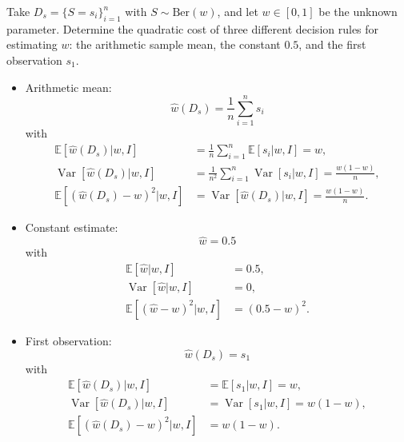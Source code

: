 \begin{example}
	Take $D_s= \{S = s_i\}_{i=1}^n$ with $S \sim \mathrm{Ber}(w)$, and let $w\in [0,1]$ be the unknown parameter. Determine the quadratic cost of three different decision rules for estimating $w$: the arithmetic sample mean, the constant $0.5$, and the first observation $s_1$.
	
	\begin{itemize}
		\item Arithmetic mean:
		\begin{equation}
			\hat{w}(D_s) = \frac{1}{n} \sum_{i=1}^n s_i
		\end{equation}
		with
		\begin{equation}
			\begin{split}
				\mathbb{E}[\hat{w}(D_s)|w,I] &= \frac{1}{n} \sum_{i=1}^n \mathbb{E}[s_i|w,I] = w,\\
				\operatorname{Var}[\hat{w}(D_s)|w,I] &= \frac{1}{n^2} \sum_{i=1}^n \operatorname{Var}[s_i|w,I] = \frac{w(1-w)}{n},\\
				\mathbb{E}[(\hat{w}(D_s)-w)^2|w,I] &= \operatorname{Var}[\hat{w}(D_s)|w,I] = \frac{w(1-w)}{n}.
			\end{split}
		\end{equation}
		
		\item Constant estimate:
		\begin{equation}
			\hat{w} = 0.5
		\end{equation}
		with
		\begin{equation}
			\begin{split}
				\mathbb{E}[\hat{w}|w,I] &= 0.5,\\
				\operatorname{Var}[\hat{w}|w,I] &= 0,\\
				\mathbb{E}[(\hat{w}-w)^2|w,I] &= (0.5 - w)^2.
			\end{split}
		\end{equation}
		
		\item First observation:
		\begin{equation}
			\hat{w}(D_s) = s_1
		\end{equation}
		with
		\begin{equation}
			\begin{split}
				\mathbb{E}[\hat{w}(D_s)|w,I] &= \mathbb{E}[s_1|w,I] = w,\\
				\operatorname{Var}[\hat{w}(D_s)|w,I] &= \operatorname{Var}[s_1|w,I] = w(1-w),\\
				\mathbb{E}[(\hat{w}(D_s)-w)^2|w,I] &= w(1-w).
			\end{split}
		\end{equation}
	\end{itemize}
	

\end{example}
